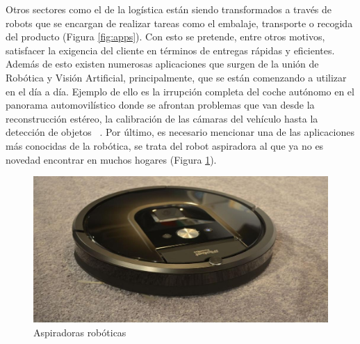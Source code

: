 \documentclass{bmvc2k}
\begin{document}
\noindent Otros sectores como el de la logística están siendo transformados a través de robots que se encargan de realizar tareas como el embalaje, transporte o recogida del producto (Figura \ref{fig:apps}). Con esto se pretende, entre otros motivos, satisfacer la exigencia del cliente en términos de entregas rápidas y eficientes. Además de esto existen numerosas aplicaciones que surgen de la unión de Robótica y Visión Artificial, principalmente, que se están comenzando a utilizar en el día a día. Ejemplo de ello es la irrupción completa del coche autónomo en el panorama automovilístico donde se afrontan problemas que van desde la reconstrucción estéreo, la calibración de las cámaras del vehículo hasta la detección de objetos ~\cite{janai2017computer}. Por último, es necesario mencionar una de las aplicaciones más conocidas de la robótica, se trata del robot aspiradora al que ya no es novedad encontrar en muchos hogares (Figura \ref{fig:roomba}).
\begin{figure}[H]
\begin{center}
\includegraphics[scale=0.20]{roomba980.jpg}
\caption{Aspiradoras robóticas}
\label{fig:roomba}
\end{center}
\end{figure}
\end{document}
